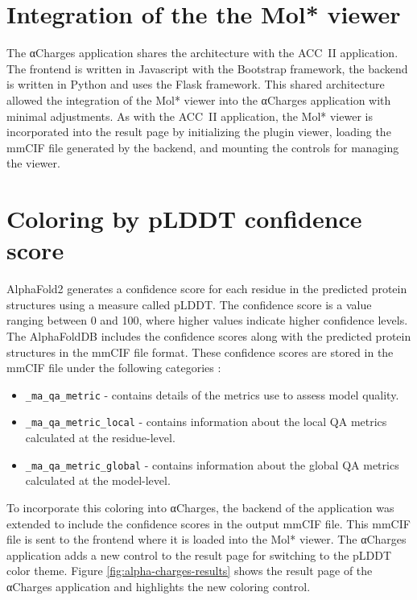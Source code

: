 \documentclass[
  digital,     %
  oneside,     %
  nosansbold,  %
  nocolorbold, %
  lof,         %
  lot,         %
]{fithesis4}
\begin{document}
\section{Integration of the the Mol* viewer}

The αCharges application shares the architecture with the ACC~II application. The frontend is written in Javascript with the Bootstrap framework, the backend is written in Python and uses the Flask framework. This shared architecture allowed the integration of the Mol* viewer into the αCharges application with minimal adjustments. As with the ACC~II application, the Mol* viewer is incorporated into the result page by initializing the plugin viewer, loading the mmCIF file generated by the backend, and mounting the controls for managing the viewer.


\section{Coloring by pLDDT confidence score}

AlphaFold2 generates a confidence score for each residue in the predicted protein structures using a measure called pLDDT. The confidence score is a value ranging between 0 and 100, where higher values indicate higher confidence levels. \cite{varadi2021alphafold} The AlphaFoldDB includes the confidence scores along with the predicted protein structures in the mmCIF file format. These confidence scores are stored in the mmCIF file under the following categories \cite{mmcif_dictionary} \cite{mmcif_dictionary}:

\begin{itemize}
  \item \texttt{\_ma\_qa\_metric} - contains details of the metrics use to assess model quality.
  \item \texttt{\_ma\_qa\_metric\_local} - contains information about the local QA metrics calculated at the residue-level.
  \item \texttt{\_ma\_qa\_metric\_global} - contains information about the global QA metrics calculated at the model-level.
\end{itemize}

To incorporate this coloring into αCharges, the backend of the application was extended to include the confidence scores in the output mmCIF file. This mmCIF file is sent to the frontend where it is loaded into the Mol* viewer. The αCharges application adds a new control to the result page for switching to the pLDDT color theme. Figure \ref{fig:alpha-charges-results} shows the result page of the αCharges application and highlights the new coloring control.
\end{document}
